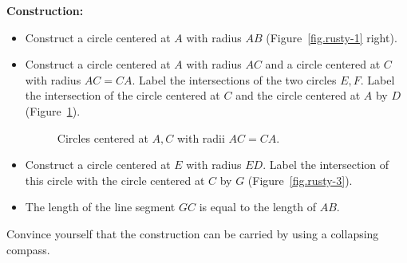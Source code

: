 \documentclass[11pt,a4paper]{article}
\begin{document}
\textbf{Construction:}
\begin{itemize}
\item Construct a circle centered at $A$ with radius $AB$ (Figure~\ref{fig.rusty-1} right).
\item Construct a circle centered at $A$ with radius $AC$ and a circle centered at $C$ with radius $AC=CA$. Label the intersections of the two circles $E,F$. Label the intersection of the circle centered at $C$ and the circle centered at $A$ by $D$ (Figure~\ref{fig.rusty-2}).
\begin{figure}[H]	
\begin{center}
\caption{Circles centered at $A,C$ with radii $AC=CA$.}\label{fig.rusty-2}
\end{center}
\end{figure}
\vspace*{-5ex}
\item Construct a circle centered at $E$ with radius $ED$. Label the intersection of this circle with the circle centered at $C$ by $G$ (Figure~\ref{fig.rusty-3}).
\item The length of the line segment $GC$ is equal to the length of $AB$.
\end{itemize}
Convince yourself that the construction can be carried by using a collapsing compass.
\end{document}

